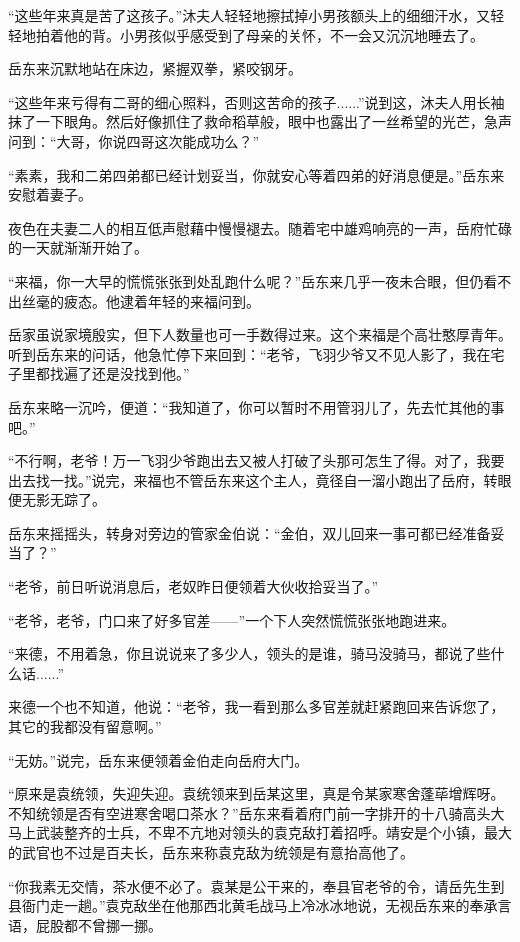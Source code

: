“这些年来真是苦了这孩子。”沐夫人轻轻地擦拭掉小男孩额头上的细细汗水，又轻轻地拍着他的背。小男孩似乎感受到了母亲的关怀，不一会又沉沉地睡去了。

岳东来沉默地站在床边，紧握双拳，紧咬钢牙。

“这些年来亏得有二哥的细心照料，否则这苦命的孩子......”说到这，沐夫人用长袖抹了一下眼角。然后好像抓住了救命稻草般，眼中也露出了一丝希望的光芒，急声问到：“大哥，你说四哥这次能成功么？”

“素素，我和二弟四弟都已经计划妥当，你就安心等着四弟的好消息便是。”岳东来安慰着妻子。

夜色在夫妻二人的相互低声慰藉中慢慢褪去。随着宅中雄鸡响亮的一声，岳府忙碌的一天就渐渐开始了。

\splitline

“来福，你一大早的慌慌张张到处乱跑什么呢？”岳东来几乎一夜未合眼，但仍看不出丝毫的疲态。他逮着年轻的来福问到。

岳家虽说家境殷实，但下人数量也可一手数得过来。这个来福是个高壮憨厚青年。听到岳东来的问话，他急忙停下来回到：“老爷，飞羽少爷又不见人影了，我在宅子里都找遍了还是没找到他。”

岳东来略一沉吟，便道：“我知道了，你可以暂时不用管羽儿了，先去忙其他的事吧。”

“不行啊，老爷！万一飞羽少爷跑出去又被人打破了头那可怎生了得。对了，我要出去找一找。”说完，来福也不管岳东来这个主人，竟径自一溜小跑出了岳府，转眼便无影无踪了。

岳东来摇摇头，转身对旁边的管家金伯说：“金伯，双儿回来一事可都已经准备妥当了？”

“老爷，前日听说消息后，老奴昨日便领着大伙收拾妥当了。”

“老爷，老爷，门口来了好多官差------”一个下人突然慌慌张张地跑进来。

“来德，不用着急，你且说说来了多少人，领头的是谁，骑马没骑马，都说了些什么话......”

来德一个也不知道，他说：“老爷，我一看到那么多官差就赶紧跑回来告诉您了，其它的我都没有留意啊。”

“无妨。”说完，岳东来便领着金伯走向岳府大门。

\splitline

“原来是袁统领，失迎失迎。袁统领来到岳某这里，真是令某家寒舍蓬荜增辉呀。不知统领是否有空进寒舍喝口茶水？”岳东来看着府门前一字排开的十八骑高头大马上武装整齐的士兵，不卑不亢地对领头的袁克敌打着招呼。靖安是个小镇，最大的武官也不过是百夫长，岳东来称袁克敌为统领是有意抬高他了。

“你我素无交情，茶水便不必了。袁某是公干来的，奉县官老爷的令，请岳先生到县衙门走一趟。”袁克敌坐在他那西北黄毛战马上冷冰冰地说，无视岳东来的奉承言语，屁股都不曾挪一挪。

